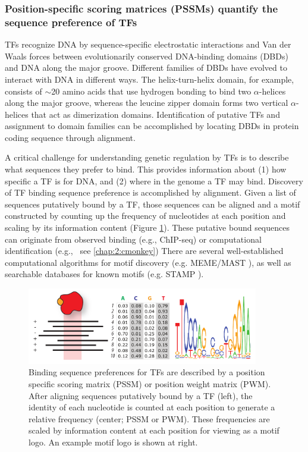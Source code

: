 \subsubsection{Position-specific scoring matrices (PSSMs) quantify the sequence preference of TFs}

\label{pssms}

TFs recognize DNA by sequence-specific electrostatic interactions and Van der Waals forces between evolutionarily conserved DNA-binding domains (DBDs) and DNA along the major groove. Different families of DBDs have evolved to interact with DNA in different ways. The helix-turn-helix domain, for example, consists of $\sim$20 amino acids that use hydrogen bonding to bind two $\alpha$-helices along the major groove, whereas the leucine zipper domain forms two vertical $\alpha$-helices that act as dimerization domains. Identification of putative TFs and assignment to domain families can be accomplished by locating DBDs in protein coding sequence through alignment. 

A critical challenge for understanding genetic regulation by TFs is to describe what sequences they prefer to bind. This provides information about (1) how specific a TF is for DNA, and (2) where in the genome a TF may bind. Discovery of TF binding sequence preference is accomplished by alignment. Given a list of sequences putatively bound by a TF, those sequences can be aligned and a motif constructed by counting up the frequency of nucleotides at each position and scaling by its information content (Figure \ref{fig:chap1:pssm}). These putative bound sequences can originate from observed binding (e.g., ChIP-seq) or computational identification (e.g., \cm\, see \ref{chap:2:cmonkey}) There are several well-established computational algorithms for motif discovery (e.g. MEME/MAST \cite{bailey_fitting_1994,bailey_methods_1998}), as well as searchable databases for known motifs (e.g. STAMP \cite{mahony_stamp:_2007}). 

\begin{figure}[h!]
    \centering
    \includegraphics[width=0.9\textwidth]{figures/pssm}
 	\caption[Position specific scoring matrix (PSSM) and motif logo]{
 	Binding sequence preferences for TFs are described by a position specific scoring matrix (PSSM) or position weight matrix (PWM). After aligning sequences putatively bound by a TF (left), the identity of each nucleotide is counted at each position to generate a relative frequency (center; PSSM or PWM). These frequencies are scaled by information content at each position for viewing as a motif logo. An example motif logo is shown at right. 
}
    \label{fig:chap1:pssm}
\end{figure}

